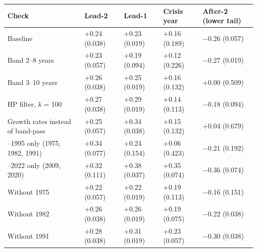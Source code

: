\documentclass[11pt,a4paper]{article}
\newcounter{none}                    %
\begin{document}
{\def\LTcaptype{none} %
\begin{longtable}[]{@{}
  >{\raggedright\arraybackslash}p{}
  >{\raggedright\arraybackslash}p{}
  >{\raggedright\arraybackslash}p{}
  >{\raggedright\arraybackslash}p{}
  >{\raggedright\arraybackslash}p{}@{}}
\toprule\noalign{}
\begin{minipage}[b]{\linewidth}\raggedright
Check
\end{minipage} & \begin{minipage}[b]{\linewidth}\raggedright
Lead-2
\end{minipage} & \begin{minipage}[b]{\linewidth}\raggedright
Lead-1
\end{minipage} & \begin{minipage}[b]{\linewidth}\raggedright
Crisis year
\end{minipage} & \begin{minipage}[b]{\linewidth}\raggedright
After-2 (lower tail)
\end{minipage} \\
\midrule\noalign{}
\endhead
\bottomrule\noalign{}
\endlastfoot
Baseline & +0.24 (0.038) & +0.23 (0.019) & +0.16 (0.189) & −0.26 (0.057) \\
Band 2–8 years & +0.23 (0.057) & +0.19 (0.094) & +0.12 (0.226) & −0.27 (0.019) \\
Band 3–10 years & +0.26 (0.038) & +0.25 (0.019) & +0.16 (0.132) & +0.00 (0.509) \\
HP filter, λ = 100 & +0.27 (0.038) & +0.29 (0.019) & +0.14 (0.113) & −0.18 (0.094) \\
Growth rates instead of band-pass & +0.25 (0.057) & +0.34 (0.038) & +0.15 (0.132) & +0.04 (0.679) \\
1970–1995 only (1975, 1982, 1991) & +0.34 (0.077) & +0.24 (0.154) & +0.06 (0.423) & −0.21 (0.192) \\
1996–2022 only (2009, 2020) & +0.32 (0.111) & +0.38 (0.037) & +0.35 (0.074) & −0.36 (0.074) \\
Without 1975 & +0.22 (0.057) & +0.22 (0.019) & +0.19 (0.113) & −0.16 (0.151) \\
Without 1982 & +0.26 (0.038) & +0.26 (0.019) & +0.19 (0.075) & −0.22 (0.038) \\
Without 1991 & +0.28 (0.038) & +0.31 (0.019) & +0.23 (0.057) & −0.30 (0.038) \\

\end{longtable}}
\end{document}
